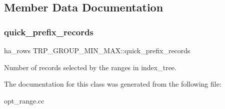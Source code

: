 \subsection{Member Data Documentation}
\mbox{\label{classTRP__GROUP__MIN__MAX_a7747b5e8ae35e3b05fbbd5aa5b3979fb}} 
\subsubsection{\texorpdfstring{quick\+\_\+prefix\+\_\+records}{quick\_prefix\_records}}
{\footnotesize\ttfamily ha\+\_\+rows T\+R\+P\+\_\+\+G\+R\+O\+U\+P\+\_\+\+M\+I\+N\+\_\+\+M\+A\+X\+::quick\+\_\+prefix\+\_\+records}

Number of records selected by the ranges in index\+\_\+tree. 

The documentation for this class was generated from the following file\+:\begin{DoxyCompactItemize}
\item 
opt\+\_\+range.\+cc\end{DoxyCompactItemize}
